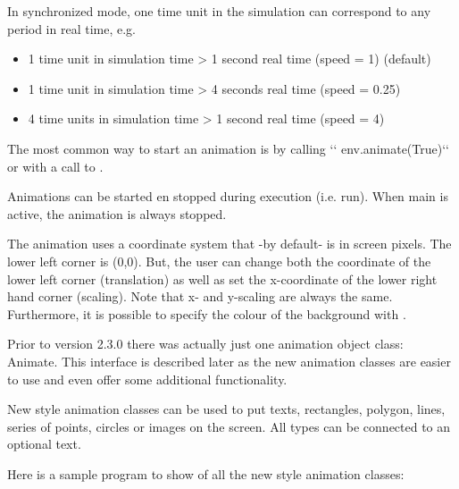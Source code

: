 \documentclass[letterpaper,10pt,english]{sphinxmanual}
\begin{document}
In synchronized mode, one time unit in the simulation can correspond to any period in real time, e.g.
\begin{itemize}
\item {} 
1 time unit in simulation time \textendash{}\textgreater{} 1 second real time (speed = 1) (default)

\item {} 
1 time unit in simulation time \textendash{}\textgreater{} 4 seconds real time (speed = 0.25)

\item {} 
4 time units in simulation time \textendash{}\textgreater{} 1 second real time (speed = 4)

\end{itemize}

The most common way to start an animation is by calling
{}`{}` env.animate(True){}`{}` or with a call to .

Animations can be started en stopped during execution (i.e. run). When main is active, the animation
is always stopped.

The animation uses a coordinate system that -by default- is in screen pixels. The lower left corner is (0,0).
But, the user can change both the coordinate of the lower left corner (translation) as well as set the x-coordinate
of the lower right hand corner (scaling). Note that x- and y-scaling are always the same. 
Furthermore, it is possible to specify the colour of the background with .

Prior to version 2.3.0 there was actually just one animation object class: Animate. This
interface is described later as the new animation classes are easier to use and even offer some
additional functionality.

New style animation classes can be used to put texts, rectangles, polygon, lines, series of points, circles
or images on the screen. All types can be connected to an optional text.

Here is a sample program to show of all the new style animation classes:
\end{document}
